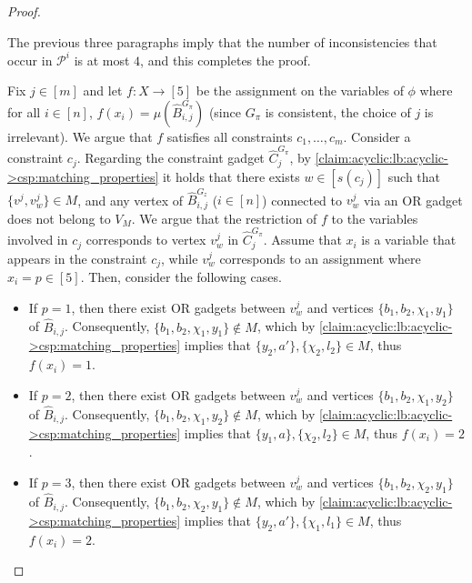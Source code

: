 \begin{proof}
\begin{nestedproof}
\begin{claimproof}
                The previous three paragraphs imply that the number of inconsistencies that occur in $\mathcal{P}^i$ is at most $4$,
                and this completes the proof.
            \end{claimproof}

            Fix $j \in [m]$ and let $f \colon X \to [5]$ be the assignment on the variables of $\phi$ where for all $i \in [n]$,
            $f(x_i) = \mu(\hat{B}^{G_\pi}_{i,j})$ (since $G_\pi$ is consistent, the choice of $j$ is irrelevant).
            We argue that $f$ satisfies all constraints $c_1, \ldots, c_m$.
            Consider a constraint $c_j$.
            Regarding the constraint gadget $\hat{C}^{G_\pi}_j$, by \cref{claim:acyclic:lb:acyclic->csp:matching_properties}
            it holds that there exists $w \in [s(c_j)]$ such that $\{v^j,v^j_w\} \in M$,
            and any vertex of $\hat{B}^{G_z}_{i,j}$ ($i \in [n]$) connected to $v^j_w$ via an OR gadget does not belong to $V_M$.
            We argue that the restriction of $f$ to the variables involved in $c_j$ corresponds to vertex $v^j_w$ in $\hat{C}^{G_\pi}_j$.
            Assume that $x_i$ is a variable that appears in the constraint $c_j$, while $v^j_w$ corresponds to an assignment where $x_i = p \in [5]$.
            Then, consider the following cases.
            \begin{itemize}
                \item If $p = 1$,
                then there exist OR gadgets between $v^j_w$ and vertices $\{b_1, b_2, \chi_1, y_1\}$ of $\hat{B}_{i,j}$.
                Consequently, $\{b_1, b_2, \chi_1, y_1\} \notin M$,
                which by \cref{claim:acyclic:lb:acyclic->csp:matching_properties} implies that $\{y_2,a'\}, \{\chi_2,l_2\} \in M$,
                thus $f(x_i) = 1$.

                \item If $p = 2$,
                then there exist OR gadgets between $v^j_w$ and vertices $\{b_1, b_2, \chi_1, y_2\}$ of $\hat{B}_{i,j}$.
                Consequently, $\{b_1, b_2, \chi_1, y_2\} \notin M$,
                which by \cref{claim:acyclic:lb:acyclic->csp:matching_properties} implies that $\{y_1,a\}, \{\chi_2,l_2\} \in M$,
                thus $f(x_i) = 2$.

                \item If $p = 3$,
                then there exist OR gadgets between $v^j_w$ and vertices $\{b_1, b_2, \chi_2, y_1\}$ of $\hat{B}_{i,j}$.
                Consequently, $\{b_1, b_2, \chi_2, y_1\} \notin M$,
                which by \cref{claim:acyclic:lb:acyclic->csp:matching_properties} implies that $\{y_2,a'\}, \{\chi_1,l_1\} \in M$,
                thus $f(x_i) = 2$.


\end{itemize}
\end{nestedproof}
\end{proof}
